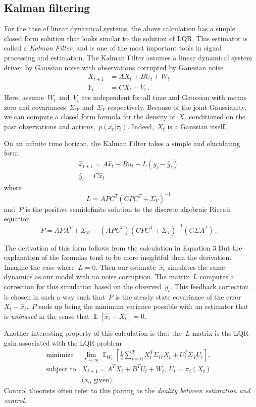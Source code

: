 \documentclass{tufte-book}
\begin{document}
\hypertarget{kalman-filtering}{%
\subsection{Kalman filtering}\label{kalman-filtering}}

For the case of linear dynamical systems, the above calculation has a
simple closed form solution that looks similar to the solution of LQR.
This estimator is called a \emph{Kalman Filter}, and is one of the most
important tools in signal processing and estimation. The Kalman Filter
assumes a linear dynamical system driven by Gaussian noise with
observations corrupted by Gaussian noise \[
\begin{aligned}
 X_{t+1} &= A X_t+ B U_t + W_t\\
 Y_{t} & = C X_t + V_t\,.
\end{aligned}
\] Here, assume~\(W_t\) and~\(V_t\) are independent for all time and
Gaussian with means zero and covariances~\(\Sigma_W\) and~\(\Sigma_V\)
respectively. Because of the joint Gaussianity, we can compute a closed
form formula for the density of~\(X_t\) conditioned on the past
observations and actions,~\(p(x_t | \tau_t)\). Indeed,~\(X_t\) is a
Gaussian itself.

On an infinite time horizon, the Kalman Filter takes a simple and
elucidating form: \[
\begin{aligned}
    \hat{x}_{t+1} = A \hat{x}_t + B u_t - L (y_t - \hat{y}_t)\\
    \hat{y}_t = C \hat{x}_t
\end{aligned}
\] where \[
    L=A P C^T (C P C^T + \Sigma_V)^{-1}
\] and~\(P\) is the positive semidefinite solution to the discrete
algebraic Riccati equation \[
    P = A P A^T + \Sigma_W - (A P C^T) (CPC^T +\Sigma_V)^{-1} (C\Sigma A^T)\,.
\]

The derivation of this form follows from the calculation in Equation 3
But the explanation of the formulas tend to be more insightful than the
derivation. Imagine the case where~\(L=0\). Then our
estimate~\(\hat{x}_t\) simulates the same dynamics as our model with no
noise corruption. The matrix~\(L\) computes a correction for this
simulation based on the observed~\(y_t\). This feedback correction is
chosen in such a way such that~\(P\) is the steady state covariance of
the error~\(X_t-\hat{x}_t\).~\(P\) ends up being the minimum variance
possible with an estimator that is \emph{unbiased} in the sense that
\(\mathop\mathbb{E}[\hat{x}_t-X_t]=0\).

Another interesting property of this calculation is that the~\(L\)
matrix is the LQR gain associated with the LQR problem \[
\begin{array}{ll}
\text{minimize} \, & \lim_{T\rightarrow \infty}\mathop\mathbb{E}_{W_t} \left[\frac{1}{2}\sum_{t=0}^T X_t^T \Sigma_W X_t + U_t^T \Sigma_V U_t\right], \\
\text{subject to} & X_{t+1} = A^T X_t+ B^T U_t + W_t,~U_t=\pi_t(X_t) \\
& \text{($x_0$ given).}
\end{array}
\] Control theorists often refer to this pairing as the \emph{duality
between estimation and control}.
\end{document}

